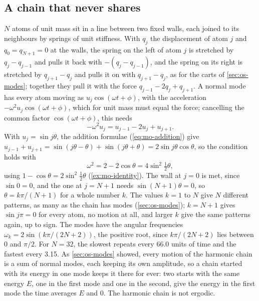 \subsection*{A chain that never shares}

$N$ atoms of unit mass sit in a line between two fixed walls, each joined
to its neighbours by springs of unit stiffness. With $q_j$ the displacement
of atom $j$ and $q_0 = q_{N+1} = 0$ at the walls, the spring on the left
of atom $j$ is stretched by $q_j - q_{j-1}$ and pulls it back with
$-(q_j - q_{j-1})$, and the spring on its right is stretched by $q_{j+1} -
q_j$ and pulls it on with $q_{j+1} - q_j$, as for the carts of
\cref{sec:os-modes}; together they pull it with the force $q_{j-1} - 2q_j
+ q_{j+1}$. A normal mode has every atom moving as $u_j\cos(\omega t +
\phi)$, with the acceleration $-\omega^2u_j\cos(\omega t + \phi)$, which
for unit mass must equal the force; cancelling the common factor
$\cos(\omega t + \phi)$, this needs
\begin{equation*}
   -\omega^2u_j = u_{j-1} - 2u_j + u_{j+1} .
\end{equation*}
With $u_j = \sin j\theta$, the addition formulae (\cref{eq:mo-addition})
give $u_{j-1} + u_{j+1} = \sin(j\theta - \theta) + \sin(j\theta + \theta)
= 2\sin j\theta\cos\theta$, so the condition holds with
\begin{equation*}
   \omega^2 = 2 - 2\cos\theta = 4\sin^2\tfrac12\theta ,
\end{equation*}
using $1 - \cos\theta = 2\sin^2\frac12\theta$ (\cref{ex:mo-identity}).
The wall at $j = 0$ is met, since $\sin0 = 0$, and the one at $j = N + 1$
needs $\sin(N + 1)\theta = 0$, so $\theta = k\pi/(N + 1)$ for a whole
number $k$. The values $k = 1$ to $N$ give $N$ different patterns, as many
as the chain has modes (\cref{sec:os-modes}); $k = N + 1$ gives $\sin
j\pi = 0$ for every atom, no motion at all, and larger $k$ give the same
patterns again, up to sign. The modes have the angular frequencies
$\omega_k = 2\sin(k\pi/(2N + 2))$, the positive root, since $k\pi/(2N +
2)$ lies between 0 and $\pi/2$. For $N =
32$, the slowest repeats every 66.0 units of time and the fastest every
3.15. As \cref{sec:os-modes} showed, every motion of the harmonic chain
is a sum of normal modes, each keeping its own amplitude, so a chain
started with its energy in one mode keeps it there for ever: two starts
with the same energy $E$, one in the first mode and one in the second,
give the energy in the first mode the time averages $E$ and 0. The
harmonic chain is not ergodic.

